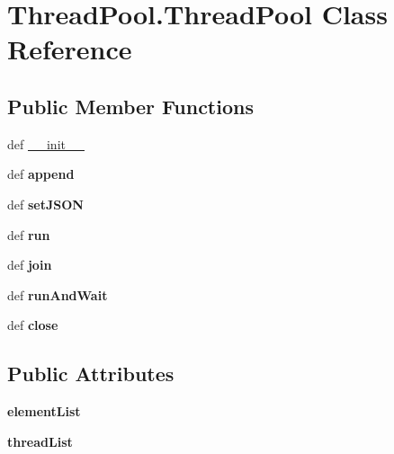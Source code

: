 \hypertarget{classThreadPool_1_1ThreadPool}{
\section{ThreadPool.ThreadPool Class Reference}
\label{classThreadPool_1_1ThreadPool}
}
\subsection*{Public Member Functions}
\begin{DoxyCompactItemize}
\item 
def \hyperlink{classThreadPool_1_1ThreadPool_ab14b61ee7e1bcde3acd5302980bb5064}{\_\-\_\-init\_\-\_\-}
\item 
\hypertarget{classThreadPool_1_1ThreadPool_af111f17394d657d2f8a844d1aab954e4}{
def {\bfseries append}}
\label{classThreadPool_1_1ThreadPool_af111f17394d657d2f8a844d1aab954e4}

\item 
\hypertarget{classThreadPool_1_1ThreadPool_aa7552e9043cac424e975d08f90183240}{
def {\bfseries setJSON}}
\label{classThreadPool_1_1ThreadPool_aa7552e9043cac424e975d08f90183240}

\item 
\hypertarget{classThreadPool_1_1ThreadPool_aa501bcbacc9a66dda41d791d8cd39d76}{
def {\bfseries run}}
\label{classThreadPool_1_1ThreadPool_aa501bcbacc9a66dda41d791d8cd39d76}

\item 
\hypertarget{classThreadPool_1_1ThreadPool_a560964bf1f1d4cdd3289872082e4233a}{
def {\bfseries join}}
\label{classThreadPool_1_1ThreadPool_a560964bf1f1d4cdd3289872082e4233a}

\item 
\hypertarget{classThreadPool_1_1ThreadPool_a0f66bbe965c3a518441a9a635550f817}{
def {\bfseries runAndWait}}
\label{classThreadPool_1_1ThreadPool_a0f66bbe965c3a518441a9a635550f817}

\item 
\hypertarget{classThreadPool_1_1ThreadPool_a9aeb99683736399c3fa149081b2cbfff}{
def {\bfseries close}}
\label{classThreadPool_1_1ThreadPool_a9aeb99683736399c3fa149081b2cbfff}

\end{DoxyCompactItemize}
\subsection*{Public Attributes}
\begin{DoxyCompactItemize}
\item 
\hypertarget{classThreadPool_1_1ThreadPool_a9bf3948c1bb079272cfc34673178c967}{
{\bfseries elementList}}
\label{classThreadPool_1_1ThreadPool_a9bf3948c1bb079272cfc34673178c967}

\item 
\hypertarget{classThreadPool_1_1ThreadPool_a77c75e05d733fb1313c5dd4dae16d947}{
{\bfseries threadList}}
\label{classThreadPool_1_1ThreadPool_a77c75e05d733fb1313c5dd4dae16d947}

\end{DoxyCompactItemize}


